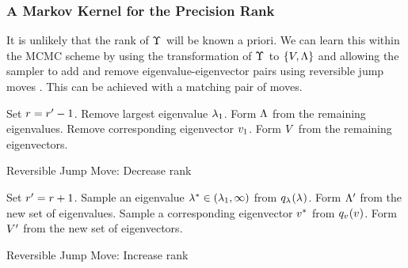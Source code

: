 \documentclass[journal,10pt]{IEEEtran}
\begin{document}
\subsubsection{A Markov Kernel for the Precision Rank}

It is unlikely that the rank of $\Upsilon_{}$ will be known a priori. We can learn this within the MCMC scheme by using the transformation of $\Upsilon_{}$ to $\{V,\Lambda\}$ and allowing the sampler to add and remove eigenvalue-eigenvector pairs using reversible jump moves \cite{Green1995,Green2009}. This can be achieved with a matching pair of moves.

\begin{algorithm}
\begin{algorithmic}
 \STATE Set $r = r' - 1$.
 \STATE Remove largest eigenvalue $\lambda_{1}$. Form $\tnmd$ from the remaining eigenvalues.
 \STATE Remove corresponding eigenvector $v_{1}$. Form $\tnmo$ from the remaining eigenvectors.
 \RETURN{$\rk$, $\tnmd$, $\tnmo$}
\end{algorithmic}
\caption{Reversible Jump Move: Decrease rank}
\label{alg:rjmcmc-down}
\end{algorithm}

\begin{algorithm}
\begin{algorithmic}
 \REQUIRE{$\rk$, $\tnmd$, $\tnmo$}
 \STATE Set $r' = r + 1$.
 \STATE Sample an eigenvalue $\lambda_{}^* \in (\lambda_{1},\infty)$ from $q_{\lambda_{}}(\lambda_{})$. Form $\Lambda'$ from the new set of eigenvalues.
 \STATE Sample a corresponding eigenvector $v_{}^*$ from $q_{v_{}}(v_{})$. Form $V'$ from the new set of eigenvectors.
\end{algorithmic}
\caption{Reversible Jump Move: Increase rank}
\label{alg:rjmcmc-up}
\end{algorithm}
\end{document}
